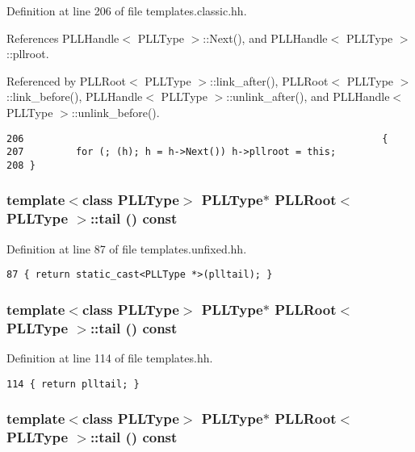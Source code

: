 Definition at line 206 of file templates.classic.hh.

References PLLHandle$<$ PLLType $>$::Next(), and PLLHandle$<$ PLLType $>$::pllroot.

Referenced by PLLRoot$<$ PLLType $>$::link\_\-after(), PLLRoot$<$ PLLType $>$::link\_\-before(), PLLHandle$<$ PLLType $>$::unlink\_\-after(), and PLLHandle$<$ PLLType $>$::unlink\_\-before().



\footnotesize\begin{verbatim}206                                                              { 
207         for (; (h); h = h->Next()) h->pllroot = this; 
208 } 
\end{verbatim}\normalsize 
{}
\subsubsection{\setlength{\rightskip}{0pt plus 5cm}template$<$class PLLType$>$ {\bf PLLType}$\ast$ PLLRoot$<$ {\bf PLLType} $>$::tail () const\hspace{0.3cm}{\tt  [inline]}}\label{classPLLRoot_a54}




Definition at line 87 of file templates.unfixed.hh.



\footnotesize\begin{verbatim}87 { return static_cast<PLLType *>(plltail); } 
\end{verbatim}\normalsize 
{}
\subsubsection{\setlength{\rightskip}{0pt plus 5cm}template$<$class PLLType$>$ {\bf PLLType}$\ast$ PLLRoot$<$ {\bf PLLType} $>$::tail () const\hspace{0.3cm}{\tt  [inline]}}\label{classPLLRoot_a37}




Definition at line 114 of file templates.hh.



\footnotesize\begin{verbatim}114 { return plltail; } 
\end{verbatim}\normalsize 
{}
\subsubsection{\setlength{\rightskip}{0pt plus 5cm}template$<$class PLLType$>$ {\bf PLLType}$\ast$ PLLRoot$<$ {\bf PLLType} $>$::tail () const\hspace{0.3cm}{\tt  [inline]}}\label{classPLLRoot_a20}




